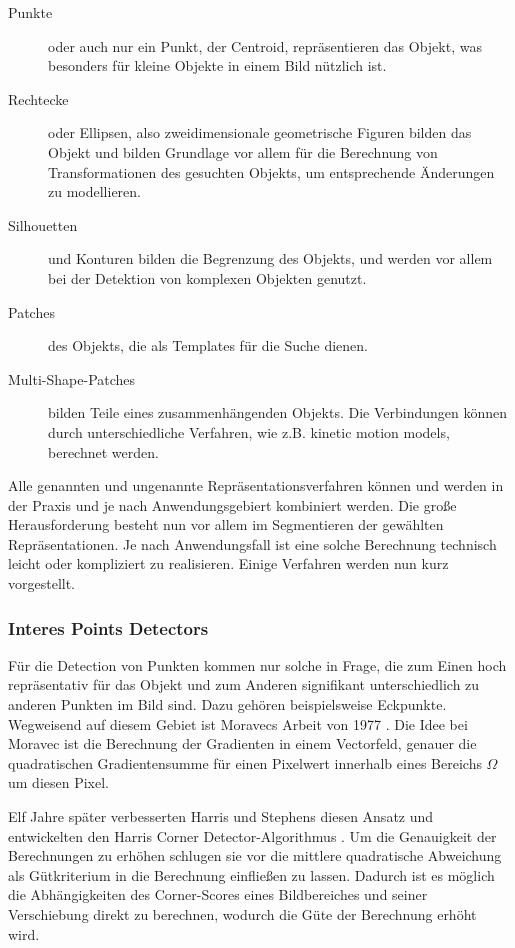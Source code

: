 \begin{description}
\item [{Punkte}] oder auch nur ein Punkt, der Centroid, repräsentieren das Objekt, was besonders für kleine Objekte in einem Bild nützlich ist.
\item [{Rechtecke}] oder Ellipsen, also zweidimensionale geometrische Figuren bilden das Objekt und bilden Grundlage vor allem für die Berechnung von Transformationen des gesuchten Objekts, um entsprechende Änderungen zu modellieren.
\item [{Silhouetten}] und Konturen bilden die Begrenzung des Objekts, und werden vor allem bei der Detektion von komplexen Objekten genutzt.
\item [{Patches}] des Objekts, die als Templates für die Suche dienen.
\item [{Multi-Shape-Patches}] bilden Teile eines zusammenhängenden Objekts. Die Verbindungen können durch unterschiedliche Verfahren, wie z.B. kinetic motion models, berechnet werden.
\end{description}

Alle genannten und ungenannte Repräsentationsverfahren können und werden in der Praxis und je nach Anwendungsgebiert kombiniert werden. Die große Herausforderung besteht nun vor allem im Segmentieren der gewählten Repräsentationen. Je nach Anwendungsfall ist eine solche Berechnung technisch leicht oder kompliziert zu realisieren. Einige Verfahren werden nun kurz vorgestellt.

\subsubsection{Interes Points Detectors}
Für die Detection von Punkten kommen nur solche in Frage, die zum Einen hoch repräsentativ für das Objekt und zum Anderen signifikant unterschiedlich zu anderen Punkten im Bild sind. Dazu gehören beispielsweise Eckpunkte. Wegweisend auf diesem Gebiet ist Moravecs Arbeit von 1977 \cite{OAN}. Die Idee bei Moravec ist die Berechnung der Gradienten in einem Vectorfeld, genauer die quadratischen Gradientensumme für einen Pixelwert innerhalb eines Bereichs $\Omega$ um diesen Pixel.

Elf Jahre später verbesserten Harris und Stephens diesen Ansatz und entwickelten den Harris Corner Detector-Algorithmus \cite{HCD}. Um die Genauigkeit der Berechnungen zu erhöhen schlugen sie vor die mittlere quadratische Abweichung als Gütkriterium in die Berechnung einfließen zu lassen. Dadurch ist es möglich die Abhängigkeiten des Corner-Scores eines Bildbereiches und seiner Verschiebung direkt zu berechnen, wodurch die Güte der Berechnung erhöht wird. 

